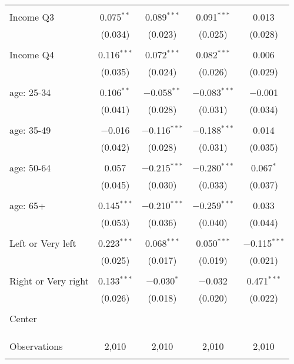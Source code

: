 \begin{tabular}{@{\extracolsep{5pt}}lcccc}
  & & & & \\ 
 Income Q3 & 0.075$^{**}$ & 0.089$^{***}$ & 0.091$^{***}$ & 0.013 \\ 
  & (0.034) & (0.023) & (0.025) & (0.028) \\ 
  & & & & \\ 
 Income Q4 & 0.116$^{***}$ & 0.072$^{***}$ & 0.082$^{***}$ & 0.006 \\ 
  & (0.035) & (0.024) & (0.026) & (0.029) \\ 
  & & & & \\ 
 age: 25-34 & 0.106$^{**}$ & $-$0.058$^{**}$ & $-$0.083$^{***}$ & $-$0.001 \\ 
  & (0.041) & (0.028) & (0.031) & (0.034) \\ 
  & & & & \\ 
 age: 35-49 & $-$0.016 & $-$0.116$^{***}$ & $-$0.188$^{***}$ & 0.014 \\ 
  & (0.042) & (0.028) & (0.031) & (0.035) \\ 
  & & & & \\ 
 age: 50-64 & 0.057 & $-$0.215$^{***}$ & $-$0.280$^{***}$ & 0.067$^{*}$ \\ 
  & (0.045) & (0.030) & (0.033) & (0.037) \\ 
  & & & & \\ 
 age: 65+ & 0.145$^{***}$ & $-$0.210$^{***}$ & $-$0.259$^{***}$ & 0.033 \\ 
  & (0.053) & (0.036) & (0.040) & (0.044) \\ 
  & & & & \\ 
 Left or Very left & 0.223$^{***}$ & 0.068$^{***}$ & 0.050$^{***}$ & $-$0.115$^{***}$ \\ 
  & (0.025) & (0.017) & (0.019) & (0.021) \\ 
  & & & & \\ 
 Right or Very right & 0.133$^{***}$ & $-$0.030$^{*}$ & $-$0.032 & 0.471$^{***}$ \\ 
  & (0.026) & (0.018) & (0.020) & (0.022) \\ 
  & & & & \\ 
 Center &  &  &  &  \\ 
  &  &  &  &  \\ 
  & & & & \\ 
\hline \\[-1.8ex] 

Observations & 2,010 & 2,010 & 2,010 & 2,010 \\ 
\hline 
\hline \\[-1.8ex] 
\end{tabular} 